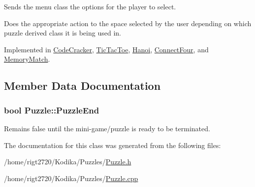 Sends the menu class the options for the player to select. 

Does the appropriate action to the space selected by the user depending on which puzzle derived class it is being used in. 

Implemented in \hyperlink{classCodeCracker_acbbd890be17cec27b879eb369de82017}{Code\-Cracker}, \hyperlink{classTicTacToe_a5fd34a83c96edbcf3c3c5a0930d513fb}{Tic\-Tac\-Toe}, \hyperlink{classHanoi_a4dd4c6028ade2b265ce98e48c3f2fb2a}{Hanoi}, \hyperlink{classConnectFour_a58bd5328672a5c6d95fde740a4131eeb}{Connect\-Four}, and \hyperlink{classMemoryMatch_a62548d6cf028d372c08cc01a0693edb2}{Memory\-Match}.



\subsection{Member Data Documentation}
\hypertarget{classPuzzle_a965ad54e9f7340c3cad944fc82c61a2b}{
\subsubsection[{Puzzle\-End}]{\setlength{\rightskip}{0pt plus 5cm}bool Puzzle\-::\-Puzzle\-End}}\label{classPuzzle_a965ad54e9f7340c3cad944fc82c61a2b}


Remains false until the mini-\/game/puzzle is ready to be terminated. 



The documentation for this class was generated from the following files\-:\begin{DoxyCompactItemize}
\item 
/home/rigt2720/\-Kodika/\-Puzzles/\hyperlink{Puzzle_8h}{Puzzle.\-h}\item 
/home/rigt2720/\-Kodika/\-Puzzles/\hyperlink{Puzzle_8cpp}{Puzzle.\-cpp}\end{DoxyCompactItemize}
